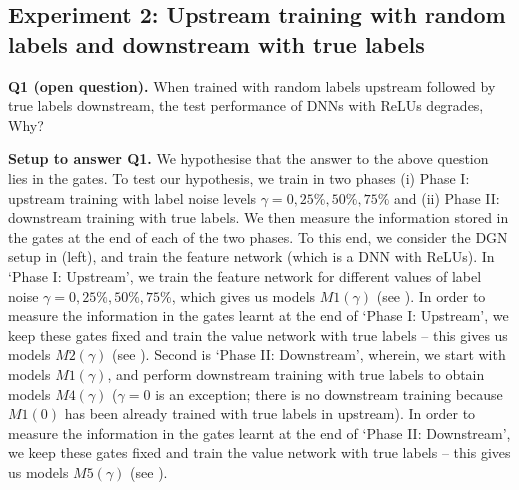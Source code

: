 \subsection{Experiment 2: Upstream training with random labels and downstream with true labels}


\textbf{Q1 (open question).} {When trained with random labels upstream followed by true labels downstream, the test performance of DNNs with ReLUs degrades, Why?}

\textbf{Setup to answer Q1.} We hypothesise that the answer to the above question lies in the gates. To test our hypothesis, we train in two phases (i) Phase I: upstream training with label noise levels $\gamma=0, 25\%, 50\%, 75\%$ and (ii) Phase II: downstream training with true labels. We then measure the information stored in the gates at the end of each of the two phases. To this end, we consider the DGN setup in  (left), and train the feature network (which is a DNN with ReLUs). In `Phase I: Upstream', we train the feature network for different values of label noise $\gamma=0, 25\%, 50\%, 75\%$, which gives us models $M1(\gamma)$ (see ). In order to measure the information in the gates learnt at the end of `Phase I: Upstream', we keep these gates fixed and train the value network with true labels -- this gives us models $M2(\gamma)$ (see ). Second is `Phase II: Downstream', wherein, we start with models $M1(\gamma)$, and perform downstream training with true labels to obtain models $M4(\gamma)$ ($\gamma=0$ is an exception; there is no downstream training because $M1(0)$ has been already trained with true labels in upstream).  In order to measure the information in the gates learnt at the end of `Phase II: Downstream', we keep these gates fixed and train the value network with true labels -- this gives us models $M5(\gamma)$ (see ).


